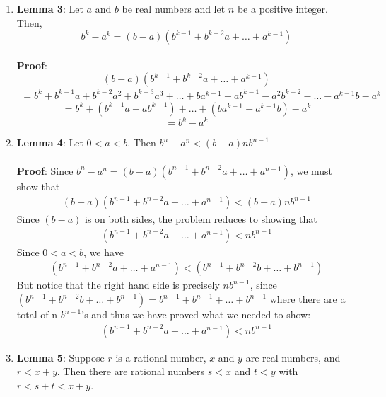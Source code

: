 \documentclass[12pt]{article}
\begin{document}
\begin{enumerate}
\item \textbf{Lemma 3}: Let $a$ and $b$ be real numbers and let $n$ be a positive integer. Then,
\begin{equation}
b^{k}-a^{k} = (b-a)(b^{k-1} + b^{k-2}a + \ldots + a^{k-1})
\end{equation} \\ 

\textbf{Proof}: \\
\begin{equation*}
(b-a)(b^{k-1}+b^{k-2}a+ \ldots + a^{k-1})
\end{equation*}
\begin{align*}
= b^{k} + b^{k-1}a + b^{k-2}a^{2} + b^{k-3}a^{3} + \dots + ba^{k-1} - ab^{k-1} - a^{2}b^{k-2} - \ldots - a^{k-1}b-a^{k}
\end{align*}
\begin{equation*}
= b^{k} + (b^{k-1}a -ab^{k-1}) + \ldots + (ba^{k-1} - a^{k-1}b) - a^{k} 
\end{equation*}
\begin{equation*}
=b^{k} - a^{k}
\end{equation*}
\item \textbf{Lemma 4}: Let $0<a<b$. Then $b^{n}-a^{n} < (b-a)nb^{n-1}$ \\ \\


\textbf{Proof}: Since $b^{n}-a^{n}=(b-a)(b^{n-1} + b^{n-2}a + \ldots + a^{n-1})$, we must show that 
\begin{align*}
(b-a)(b^{n-1} + b^{n-2}a + \ldots + a^{n-1}) < (b-a)nb^{n-1}
\end{align*}
Since $(b-a)$ is on both sides, the problem reduces to showing that 
\begin{align*}
(b^{n-1} + b^{n-2}a + \ldots + a^{n-1})<nb^{n-1}
\end{align*}
Since  $0<a<b$, we have \begin{align*}
(b^{n-1} + b^{n-2}a + \ldots + a^{n-1})< (b^{n-1} + b^{n-2}b + \ldots + b^{n-1})
\end{align*}
But notice that the right hand side is precisely $nb^{n-1}$, since $(b^{n-1} + b^{n-2}b + \ldots + b^{n-1})= b^{n-1}+b^{n-1}+ \ldots + b^{n-1}$ where there are a total of n $b^{n-1}$'s and thus we have proved what we needed to show:
\begin{align*}
(b^{n-1} + b^{n-2}a + \ldots + a^{n-1})<nb^{n-1}
\end{align*}
\item \textbf{Lemma 5}: Suppose $r$ is a rational number, $x$ and $y$ are real numbers, and $r<x+y$. Then there are rational numbers $s<x$ and $t<y$ with $r<s+t<x+y$. \\ \\



\end{enumerate}
\end{document}
